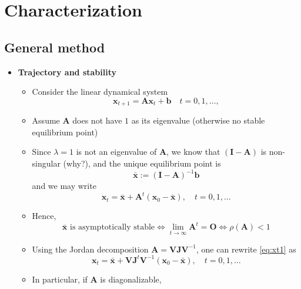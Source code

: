 \documentclass[12pt,a4paper]{article}
\begin{document}
\section{Characterization}

\subsection{General method}

\begin{itemize}

\item \textbf{Trajectory and stability}
  \begin{itemize}
  \item Consider the linear dynamical system
    \begin{equation}\label{eq:LDSgeneral}\nonumber%
      \bm{x}_{t+1} = \bm{A}\bm{x}_{t} + \bm{b}
      \quad t = 0, 1, \ldots,
    \end{equation}
  \item Assume $\bm{A}$ does not have $1$ as its eigenvalue
    (otherwise no stable equilibrium point)
  \item Since $\lambda=1$ is not an eigenvalue of $\bm{A}$,
    we know that $(\bm{I}-\bm{A})$ is non-singular (why?), and 
    the unique equilibrium point is
    \begin{equation}\nonumber%
      \bar{\bm{x}} := (\bm{I}-\bm{A})^{-1}\bm{b}
    \end{equation}
    and we may write
    \begin{equation}\label{eq:xt1}%
      \bm{x}_{t} = \bar{\bm{x}} +  \bm{A}^{t}(\bm{x}_{0}-\bar{\bm{x}}),
      \quad t = 0, 1, \ldots
    \end{equation}
  \item Hence,
    \begin{equation}\nonumber%
      \text{$\bar{\bm{x}}$ is asymptotically stable}
      \iff
      \lim_{t\to\infty}\bm{A}^{t} = \bm{O}
      \iff
      \rho(\bm{A}) < 1
    \end{equation}
  \item Using the Jordan decomposition $\bm{A}=\bm{V}\bm{J}\bm{V}^{-1}$,
    one can rewrite \eqref{eq:xt1} as
    \begin{equation}\nonumber%
      \bm{x}_{t}
      = \bar{\bm{x}}
      + \bm{V}\bm{J}^{t}\bm{V}^{-1}(\bm{x}_{0}-\bar{\bm{x}}),
      \quad t = 0, 1, \ldots
    \end{equation}
  \item In particular, if $\bm{A}$ is diagonalizable,

\end{itemize}
\end{itemize}
\end{document}
